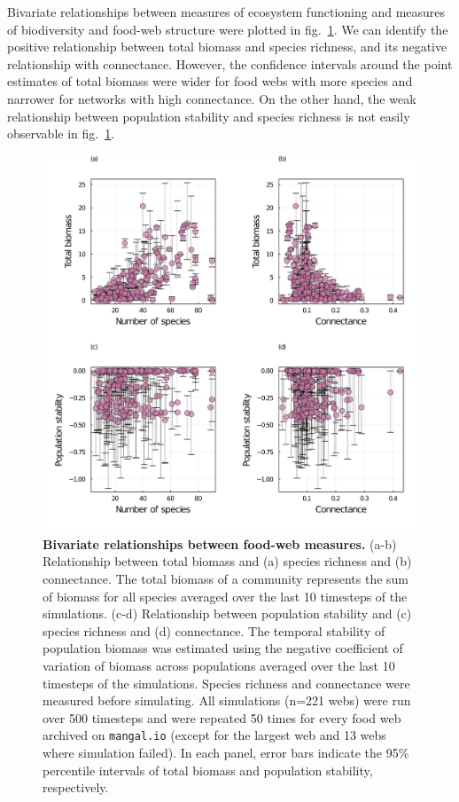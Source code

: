 \documentclass[10pt,oneside]{article}
\makeatletter
\def\maxwidth{\ifdim\Gin@nat@width>\linewidth\linewidth
\else\Gin@nat@width\fi}
\let\Oldincludegraphics\includegraphics
\renewcommand{\includegraphics}[1]{\Oldincludegraphics[width=\maxwidth]{#1}}
\makeatother
\begin{document}
Bivariate relationships between measures of ecosystem functioning and
measures of biodiversity and food-web structure were plotted in
fig.~\ref{fig:bivariate}. We can identify the positive relationship
between total biomass and species richness, and its negative
relationship with connectance. However, the confidence intervals around
the point estimates of total biomass were wider for food webs with more
species and narrower for networks with high connectance. On the other
hand, the weak relationship between population stability and species
richness is not easily observable in fig.~\ref{fig:bivariate}.

\begin{figure}
\hypertarget{fig:bivariate}{%
\centering
\includegraphics{figures/bivariate_relationships.png}
\caption{\textbf{Bivariate relationships between food-web measures.}
(a-b) Relationship between total biomass and (a) species richness and
(b) connectance. The total biomass of a community represents the sum of
biomass for all species averaged over the last 10 timesteps of the
simulations. (c-d) Relationship between population stability and (c)
species richness and (d) connectance. The temporal stability of
population biomass was estimated using the negative coefficient of
variation of biomass across populations averaged over the last 10
timesteps of the simulations. Species richness and connectance were
measured before simulating. All simulations (n=221 webs) were run over
500 timesteps and were repeated 50 times for every food web archived on
\texttt{mangal.io} (except for the largest web and 13 webs where
simulation failed). In each panel, error bars indicate the 95\%
percentile intervals of total biomass and population stability,
respectively.}\label{fig:bivariate}
}
\end{figure}
\end{document}
